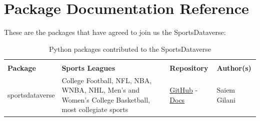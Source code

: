 \documentclass[12pt]{article}
\begin{document}
\section{Package Documentation Reference}
These are the packages that have agreed to join us the SportsDataverse:
\begin{table}[!htbp]
\centering
\renewcommand{\arraystretch}{1.3}
\begin{tabular}{>{\raggedright}m{1.0in} >{\raggedright}m{2.2in} >{\centering}m{0.8in} >{\raggedright\arraybackslash}m{2.0in}}
\toprule
\multicolumn{4}{c}{\textbf{Python Packages in the SportsDataverse}} \\
\textbf{Package} & \textbf{Sports Leagues} & \textbf{Repository} & \textbf{Author(s)} \\ 
 \midrule
    sportsdataverse & College Football, NFL, NBA, WNBA, NHL, Men's and Women's College Basketball, most collegiate sports & \href{https://github.com/saiemgilani/sportsdataverse-py/}{GitHub} - \href{https://py.sportsdataverse.org/}{Docs} & Saiem Gilani\\
\bottomrule
\end{tabular}
\vspace{5pt}
\caption{Python packages contributed to the SportsDataverse}
\label{tbl:sdvpy}
\vspace{-7mm}
\end{table}
\end{document}

